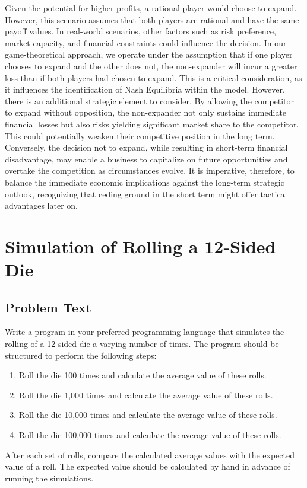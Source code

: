 \documentclass[a4paper, 10pt]{article}
\begin{document}
            Given the potential for higher profits, a rational player would choose to expand. However, this scenario assumes that both players are rational and have the same payoff values. In real-world scenarios, other factors such as risk preference, market capacity, and financial constraints could influence the decision.
            In our game-theoretical approach, we operate under the assumption that if one player chooses to expand and the other does not, the non-expander will incur a greater loss than if both players had chosen to expand. This is a critical consideration, as it influences the identification of Nash Equilibria within the model. However, there is an additional strategic element to consider. By allowing the competitor to expand without opposition, the non-expander not only sustains immediate financial losses but also risks yielding significant market share to the competitor. This could potentially weaken their competitive position in the long term. Conversely, the decision not to expand, while resulting in short-term financial disadvantage, may enable a business to capitalize on future opportunities and overtake the competition as circumstances evolve. It is imperative, therefore, to balance the immediate economic implications against the long-term strategic outlook, recognizing that ceding ground in the short term might offer tactical advantages later on.

    \section{Simulation of Rolling a 12-Sided Die}
        \subsection{Problem Text}
            Write a program in your preferred programming language that simulates the rolling of a 12-sided die a varying number of times. The program should be structured to perform the following steps:

            \begin{enumerate}
                \item Roll the die 100 times and calculate the average value of these rolls.
                \item Roll the die 1,000 times and calculate the average value of these rolls.
                \item Roll the die 10,000 times and calculate the average value of these rolls.
                \item Roll the die 100,000 times and calculate the average value of these rolls.
            \end{enumerate}

            After each set of rolls, compare the calculated average values with the expected value of a roll. The expected value should be calculated by hand in advance of running the simulations.

\end{document}
